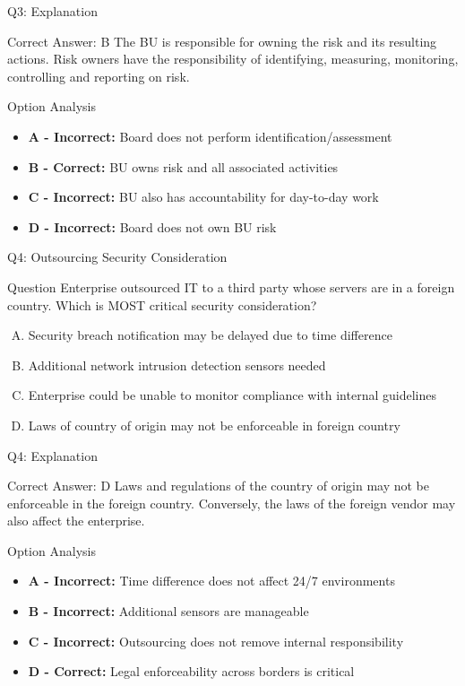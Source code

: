 \documentclass{beamer}
\begin{document}
	\begin{frame}{Q3: Explanation}
		\begin{block}{Correct Answer: B}
			The BU is responsible for owning the risk and its resulting actions. Risk owners have the responsibility of identifying, measuring, monitoring, controlling and reporting on risk.
		\end{block}
		\begin{block}{Option Analysis}
			\begin{itemize}
				\item \textbf{A - Incorrect:} Board does not perform identification/assessment
				\item \textbf{B - Correct:} BU owns risk and all associated activities
				\item \textbf{C - Incorrect:} BU also has accountability for day-to-day work
				\item \textbf{D - Incorrect:} Board does not own BU risk
			\end{itemize}
		\end{block}
	\end{frame}
	
	\begin{frame}{Q4: Outsourcing Security Consideration}
		\begin{block}{Question}
			Enterprise outsourced IT to a third party whose servers are in a foreign country. Which is MOST critical security consideration?
		\end{block}
		\begin{enumerate}[(A)]
			\item Security breach notification may be delayed due to time difference
			\item Additional network intrusion detection sensors needed
			\item Enterprise could be unable to monitor compliance with internal guidelines
			\item Laws of country of origin may not be enforceable in foreign country
		\end{enumerate}
	\end{frame}
	
	\begin{frame}{Q4: Explanation}
		\begin{block}{Correct Answer: D}
			Laws and regulations of the country of origin may not be enforceable in the foreign country. Conversely, the laws of the foreign vendor may also affect the enterprise.
		\end{block}
		\begin{block}{Option Analysis}
			\begin{itemize}
				\item \textbf{A - Incorrect:} Time difference does not affect 24/7 environments
				\item \textbf{B - Incorrect:} Additional sensors are manageable
				\item \textbf{C - Incorrect:} Outsourcing does not remove internal responsibility
				\item \textbf{D - Correct:} Legal enforceability across borders is critical
			\end{itemize}
		\end{block}
	\end{frame}
	
\end{document}
